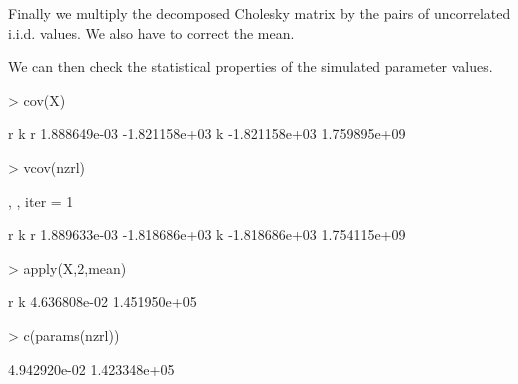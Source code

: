 \documentclass[a4paper]{article}
\begin{document}
Finally we multiply the decomposed Cholesky matrix by the pairs of uncorrelated
i.i.d. values. We also have to correct the mean.

\begin{center}
\begin{minipage}[H]{0.95\textwidth}%
\begin{shaded}%
\begin{Schunk}
\end{Schunk}
\end{shaded}%
\end{minipage}
\end{center}

We can then check the statistical properties of the simulated parameter values.
\begin{center}
\begin{minipage}[H]{0.95\textwidth}%
\begin{shaded}%
\begin{Schunk}
\begin{Sinput}
> cov(X)
\end{Sinput}
\begin{Soutput}
              r             k
r  1.888649e-03 -1.821158e+03
k -1.821158e+03  1.759895e+09
\end{Soutput}
\begin{Sinput}
> vcov(nzrl)
\end{Sinput}
\begin{Soutput}
, , iter = 1

   
                r             k
  r  1.889633e-03 -1.818686e+03
  k -1.818686e+03  1.754115e+09
\end{Soutput}
\begin{Sinput}
> apply(X,2,mean)
\end{Sinput}
\begin{Soutput}
           r            k 
4.636808e-02 1.451950e+05 
\end{Soutput}
\begin{Sinput}
> c(params(nzrl))
\end{Sinput}
\begin{Soutput}
[1] 4.942920e-02 1.423348e+05
\end{Soutput}
\end{Schunk}
\end{shaded}%
\end{minipage}
\end{center}
\end{document}
